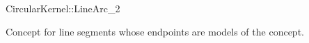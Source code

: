 \begin{ccRefConcept}{CircularKernel::LineArc_2}

\ccDefinition

Concept for line segments whose endpoints are models of the 
 concept. 

\ccHasModels
{}

\end{ccRefConcept}
